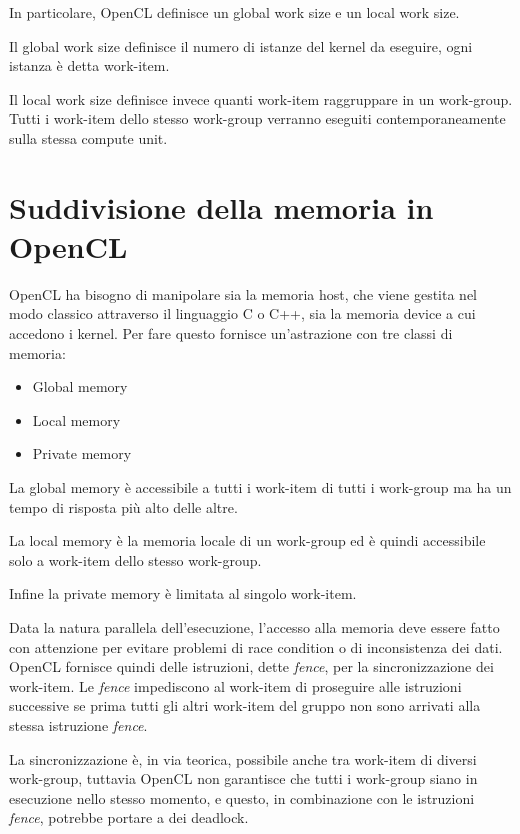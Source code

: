 In particolare, OpenCL definisce un global work size e un local work size.

Il global work size definisce il numero di istanze del kernel da eseguire, ogni istanza è detta work-item.

Il local work size definisce invece quanti work-item raggruppare in un work-group. Tutti i work-item dello stesso work-group verranno eseguiti contemporaneamente sulla stessa compute unit.

\section{Suddivisione della memoria in OpenCL}

OpenCL ha bisogno di manipolare sia la memoria host, che viene gestita nel modo classico attraverso il linguaggio C o C++, sia la memoria device a cui accedono i kernel. 
Per fare questo fornisce un'astrazione con tre classi di memoria:

\begin{itemize}
	\item Global memory
	\item Local memory
	\item Private memory
\end{itemize}

La global memory è accessibile a tutti i work-item di tutti i work-group ma ha un tempo di risposta più alto delle altre.

La local memory è la memoria locale di un work-group ed è quindi accessibile solo a work-item dello stesso work-group.

Infine la private memory è limitata al singolo work-item.

Data la natura parallela dell'esecuzione, l'accesso alla memoria deve essere fatto con attenzione per evitare problemi di race condition o di inconsistenza dei dati.
OpenCL fornisce quindi delle istruzioni, dette \textit{fence}, per la sincronizzazione dei work-item. Le \textit{fence} impediscono al work-item di proseguire alle istruzioni successive se prima tutti gli altri work-item del gruppo non sono arrivati alla stessa istruzione \textit{fence}.

La sincronizzazione è, in via teorica, possibile anche tra work-item di diversi work-group, tuttavia OpenCL non garantisce che tutti i work-group siano in esecuzione nello stesso momento, e questo, in combinazione con le istruzioni \textit{fence}, potrebbe portare a dei deadlock.